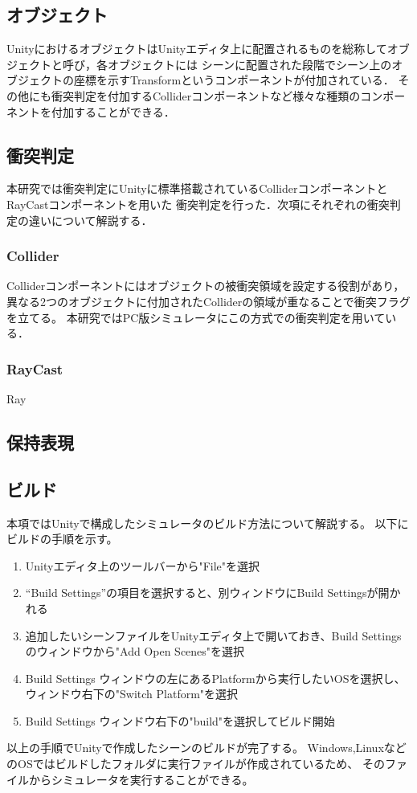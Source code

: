 \documentclass{ltjsreport}
\begin{document}
		\subsection{オブジェクト}
			UnityにおけるオブジェクトはUnityエディタ上に配置されるものを総称してオブジェクトと呼び，各オブジェクトには
			シーンに配置された段階でシーン上のオブジェクトの座標を示すTransformというコンポーネントが付加されている．
			その他にも衝突判定を付加するColliderコンポーネントなど様々な種類のコンポーネントを付加することができる．
		\subsection{衝突判定}
			本研究では衝突判定にUnityに標準搭載されているColliderコンポーネントとRayCastコンポーネントを用いた
			衝突判定を行った．次項にそれぞれの衝突判定の違いについて解説する．
			\subsubsection{Collider}
				Colliderコンポーネントにはオブジェクトの被衝突領域を設定する役割があり，
				異なる2つのオブジェクトに付加されたColliderの領域が重なることで衝突フラグを立てる。
				本研究ではPC版シミュレータにこの方式での衝突判定を用いている．
			\subsubsection{RayCast}
				Ray
		\subsection{保持表現}
		\subsection{ビルド}
			本項ではUnityで構成したシミュレータのビルド方法について解説する。
			以下にビルドの手順を示す。
			\begin{enumerate}
				\item Unityエディタ上のツールバーから"File"を選択
				\item ``Build Settings''の項目を選択すると、別ウィンドウにBuild Settingsが開かれる
				\item 追加したいシーンファイルをUnityエディタ上で開いておき、Build Settingsのウィンドウから"Add Open Scenes"を選択
				\item Build Settings ウィンドウの左にあるPlatformから実行したいOSを選択し、ウィンドウ右下の"Switch Platform"を選択
				\item Build Settings ウィンドウ右下の"build"を選択してビルド開始
			\end{enumerate}
			以上の手順でUnityで作成したシーンのビルドが完了する。
			Windows,LinuxなどのOSではビルドしたフォルダに実行ファイルが作成されているため、
			そのファイルからシミュレータを実行することができる。
\end{document}
